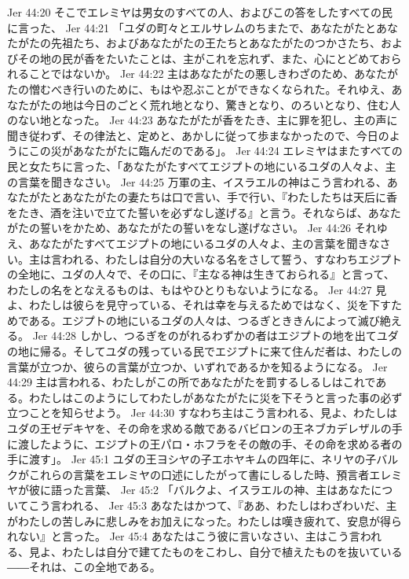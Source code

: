 Jer 44:20  そこでエレミヤは男女のすべての人、およびこの答をしたすべての民に言った、
Jer 44:21  「ユダの町々とエルサレムのちまたで、あなたがたとあなたがたの先祖たち、およびあなたがたの王たちとあなたがたのつかさたち、およびその地の民が香をたいたことは、主がこれを忘れず、また、心にとどめておられることではないか。
Jer 44:22  主はあなたがたの悪しきわざのため、あなたがたの憎むべき行いのために、もはや忍ぶことができなくなられた。それゆえ、あなたがたの地は今日のごとく荒れ地となり、驚きとなり、のろいとなり、住む人のない地となった。
Jer 44:23  あなたがたが香をたき、主に罪を犯し、主の声に聞き従わず、その律法と、定めと、あかしに従って歩まなかったので、今日のようにこの災があなたがたに臨んだのである」。
Jer 44:24  エレミヤはまたすべての民と女たちに言った、「あなたがたすべてエジプトの地にいるユダの人々よ、主の言葉を聞きなさい。
Jer 44:25  万軍の主、イスラエルの神はこう言われる、あなたがたとあなたがたの妻たちは口で言い、手で行い、『わたしたちは天后に香をたき、酒を注いで立てた誓いを必ずなし遂げる』と言う。それならば、あなたがたの誓いをかため、あなたがたの誓いをなし遂げなさい。
Jer 44:26  それゆえ、あなたがたすべてエジプトの地にいるユダの人々よ、主の言葉を聞きなさい。主は言われる、わたしは自分の大いなる名をさして誓う、すなわちエジプトの全地に、ユダの人々で、その口に、『主なる神は生きておられる』と言って、わたしの名をとなえるものは、もはやひとりもないようになる。
Jer 44:27  見よ、わたしは彼らを見守っている、それは幸を与えるためではなく、災を下すためである。エジプトの地にいるユダの人々は、つるぎとききんによって滅び絶える。
Jer 44:28  しかし、つるぎをのがれるわずかの者はエジプトの地を出てユダの地に帰る。そしてユダの残っている民でエジプトに来て住んだ者は、わたしの言葉が立つか、彼らの言葉が立つか、いずれであるかを知るようになる。
Jer 44:29  主は言われる、わたしがこの所であなたがたを罰するしるしはこれである。わたしはこのようにしてわたしがあなたがたに災を下そうと言った事の必ず立つことを知らせよう。
Jer 44:30  すなわち主はこう言われる、見よ、わたしはユダの王ゼデキヤを、その命を求める敵であるバビロンの王ネブカデレザルの手に渡したように、エジプトの王パロ・ホフラをその敵の手、その命を求める者の手に渡す」。
Jer 45:1  ユダの王ヨシヤの子エホヤキムの四年に、ネリヤの子バルクがこれらの言葉をエレミヤの口述にしたがって書にしるした時、預言者エレミヤが彼に語った言葉、
Jer 45:2  「バルクよ、イスラエルの神、主はあなたについてこう言われる、
Jer 45:3  あなたはかつて、『ああ、わたしはわざわいだ、主がわたしの苦しみに悲しみをお加えになった。わたしは嘆き疲れて、安息が得られない』と言った。
Jer 45:4  あなたはこう彼に言いなさい、主はこう言われる、見よ、わたしは自分で建てたものをこわし、自分で植えたものを抜いている――それは、この全地である。
